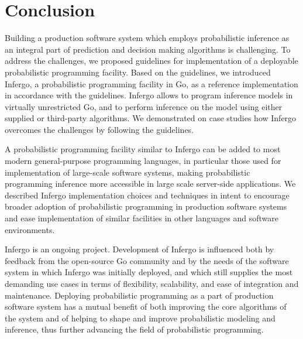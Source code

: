 \documentclass[sigplan,review,10pt,anonymous]{acmart}
\begin{document}
\begin{sloppypar}
\section{Conclusion}

Building a production software system which employs
probabilistic inference as an integral part of prediction and
decision making algorithms is challenging. To address the
challenges, we proposed guidelines for implementation of a
deployable probabilistic programming facility. Based on the
guidelines, we introduced Infergo, a probabilistic programming
facility in Go, as a reference implementation in accordance with
the guidelines.  Infergo allows to program inference models in
virtually unrestricted Go, and to perform inference on the model
using either supplied or third-party algorithms. We demonstrated
on case studies how Infergo overcomes the challenges by
following the guidelines.

A probabilistic programming facility similar to Infergo can be
added to most modern general-purpose programming languages, in
particular those used for implementation of large-scale software
systems, making probabilistic programming inference more
accessible in large scale server-side applications. We described
Infergo implementation choices and techniques in intent
to encourage broader adoption of probabilistic programming in
production software systems and ease implementation of similar
facilities in other languages and software environments.

Infergo is an ongoing project. Development of Infergo is
influenced both by feedback from the open-source Go community
and by the needs of the software system in which Infergo was
initially deployed, and which still supplies the most demanding
use cases in terms of flexibility, scalability, and ease of
integration and maintenance. Deploying probabilistic programming
as a part of production software system has a mutual benefit of
both improving the core algorithms of the system and of helping
to shape and improve probabilistic modeling and inference, thus
further advancing the field of probabilistic programming.

\end{sloppypar}

\clearpage
\clearpage



\clearpage

\appendix
\end{document}
